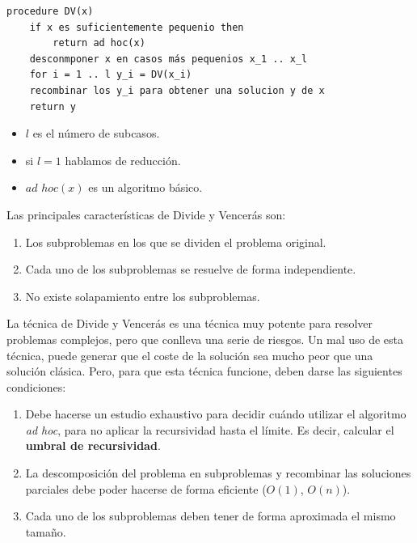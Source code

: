 \documentclass[10pt,a4paper,spanish]{report}
\theoremstyle{definition}
\theoremstyle{remark}
\begin{document}
\begin{verbatim}
procedure DV(x)
    if x es suficientemente pequenio then
        return ad hoc(x)
    desconmponer x en casos más pequenios x_1 .. x_l
    for i = 1 .. l y_i = DV(x_i)
    recombinar los y_i para obtener una solucion y de x
    return y    
\end{verbatim}

\begin{itemize}
    \item $l$ es el número de subcasos.
    \item si $l=1$ hablamos de reducción.
    \item $ad$ $hoc(x)$ es un algoritmo básico.
\end{itemize}

Las principales características de Divide y Vencerás son:
\begin{enumerate}[$\spadesuit$]
    \item Los subproblemas en los que se dividen el problema original.
    \item Cada uno de los subproblemas se resuelve de forma independiente.
    \item No existe solapamiento entre los subproblemas.
\end{enumerate}

La técnica de Divide y Vencerás es una técnica muy potente para resolver problemas complejos, pero que conlleva una serie de riesgos. Un mal uso de esta técnica, puede generar que el coste de la solución sea mucho peor que una solución clásica. Pero, para que esta técnica funcione, deben darse las siguientes condiciones:

\begin{enumerate}[$\spadesuit$]
    \item Debe hacerse un estudio exhaustivo para decidir cuándo utilizar el algoritmo \textit{\textcolor[rgb]{0.2,0.5,0.5}{ad hoc}}, para no aplicar la recursividad hasta el límite. Es decir, calcular el \textbf{\textcolor[rgb]{0.2,0.5,0.5}{umbral de recursividad}}.

    \item La descomposición del problema en subproblemas y recombinar las soluciones parciales debe poder hacerse de forma eficiente ($O(1)$, $O(n)$).

    \item Cada uno de los subproblemas deben tener de forma aproximada el mismo tamaño.
\end{enumerate}
\end{document}
